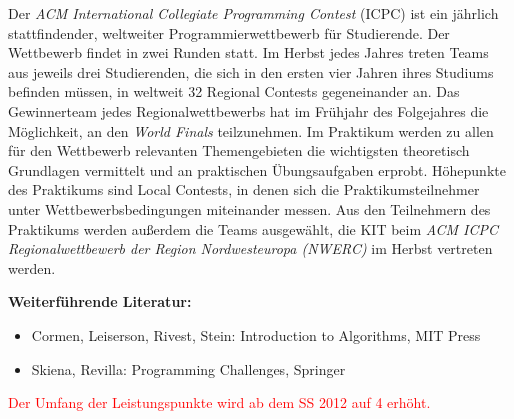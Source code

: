 \begin{course}
\begin{content}
Der \emph{ACM International Collegiate Programming Contest} (ICPC) ist ein jährlich stattfindender, weltweiter Programmierwettbewerb für Studierende. Der Wettbewerb findet in zwei Runden statt. Im Herbst jedes Jahres treten Teams aus jeweils drei Studierenden, die sich in den ersten vier Jahren ihres Studiums befinden müssen, in weltweit 32 Regional Contests gegeneinander an. Das Gewinnerteam jedes Regionalwettbewerbs hat im Frühjahr des Folgejahres die Möglichkeit, an den \emph{World Finals} teilzunehmen. \newline
\newline
Im Praktikum werden zu allen für den Wettbewerb relevanten Themengebieten die wichtigsten theoretisch Grundlagen vermittelt und an praktischen Übungsaufgaben erprobt. Höhepunkte des Praktikums sind Local Contests, in denen sich die Praktikumsteilnehmer unter Wettbewerbsbedingungen miteinander messen. \newline
\newline
Aus den Teilnehmern des Praktikums werden außerdem die Teams ausgewählt, die KIT beim \emph{ACM ICPC Regionalwettbewerb der Region Nordwesteuropa (NWERC)} im Herbst vertreten werden.


\end{content}



\begin{literature}\textbf{Weiterführende Literatur:}

 \begin{itemize}\item Cormen, Leiserson, Rivest, Stein: Introduction to Algorithms, MIT Press  \item Skiena, Revilla: Programming Challenges, Springer  \end{itemize}\end{literature}

\begin{remarks}\textcolor{red}{Der Umfang der Leistungspunkte wird ab dem SS 2012 auf 4 erhöht.}

\end{remarks}

\end{course}